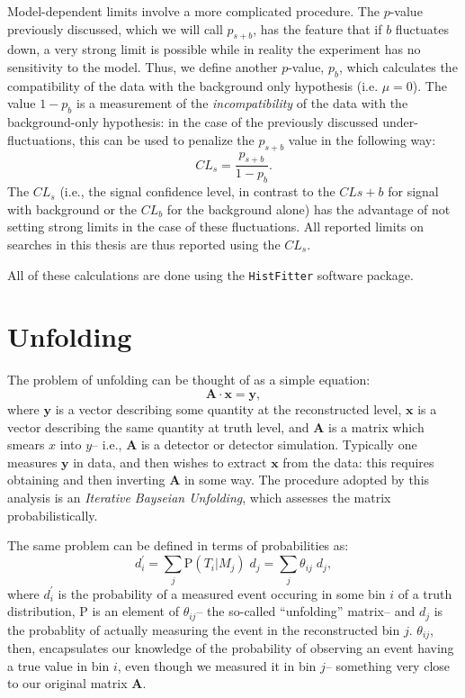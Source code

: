 Model-dependent limits involve a more complicated procedure. The $p$-value previously discussed, which we will call $p_{s+b}$, has the feature that if $b$ fluctuates down, a very strong limit is possible while in reality the experiment has no sensitivity to the model. Thus, we define another $p$-value, $p_b$, which calculates the compatibility of the data with the background only hypothesis (i.e. $\mu=0$). The value $1-p_b$ is a measurement of the \textit{incompatibility} of the data with the background-only hypothesis: in the case of the previously discussed under-fluctuations, this can be used to penalize the $p_{s+b}$ value in the following way:
%
\begin{equation}
CL_s = \frac{p_{s+b}}{1-p_b}.
\end{equation} 
%
The $CL_s$ (i.e., the signal confidence level, in contrast to the $CL{s+b}$ for signal with background or the $CL_b$ for the background alone) has the advantage of not setting strong limits in the case of these fluctuations. All reported limits on searches in this thesis are thus reported using the $CL_s$.

All of these calculations are done using the \texttt{HistFitter} software package. 

\section{Unfolding}
\label{appendix:statistics:unfolding}

	The problem of unfolding can be thought of as a simple equation:
	\begin{equation}
	\mathbf{A} \cdot \mathbf{x} = \mathbf{y},
	\end{equation}
	where $\mathbf{y}$ is a vector describing some quantity at the reconstructed level, $\mathbf{x}$ is a vector describing the same quantity at truth level, and $\mathbf{A}$ is a matrix which smears $x$ into $y$-- i.e., $\mathbf{A}$ is a detector or detector simulation. Typically one measures $\mathbf{y}$ in data, and then wishes to extract $\mathbf{x}$ from the data: this requires obtaining and then inverting $\mathbf{A}$ in some way. The procedure adopted by this analysis is an \textit{Iterative Bayseian Unfolding}, which assesses the matrix probabilistically. 

	The same problem can be defined in terms of probabilities as:
%
\begin{equation}
  d^\prime_i = \sum_j\mathrm{P}(T_i|M_j)\;d_j  = \sum_{j}\theta_{ij}\;d_j,
\end{equation}
%
	where $d^\prime_i$ is the probability of a measured event occuring in some bin $i$ of a truth distribution, $\mathrm{P}$ is an element of $\theta_{ij}$-- the so-called ``unfolding'' matrix-- and $d_j$ is the probablity of actually measuring the event in the reconstructed bin $j$. $\theta_{ij}$, then, encapsulates our knowledge of the probability of observing an event having a true value in bin $i$, even though we measured it in bin $j$-- something very close to our original matrix $\mathbf{A}$.

